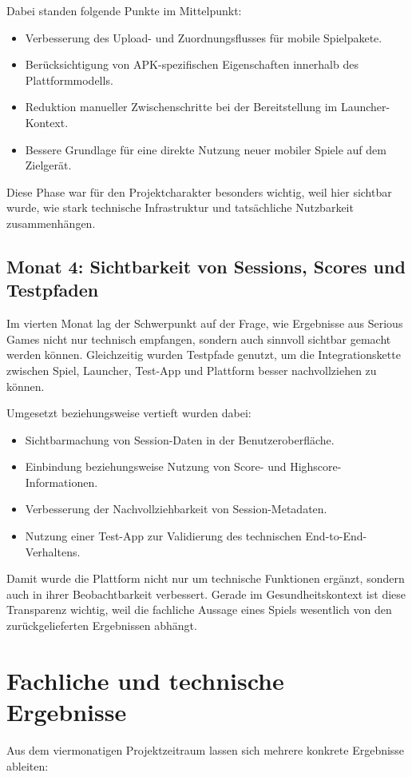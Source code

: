 \documentclass[12pt,a4paper]{article}
\begin{document}
Dabei standen folgende Punkte im Mittelpunkt:
\begin{itemize}[leftmargin=1.5em]
  \item Verbesserung des Upload- und Zuordnungsflusses für mobile Spielpakete.
  \item Berücksichtigung von APK-spezifischen Eigenschaften innerhalb des Plattformmodells.
  \item Reduktion manueller Zwischenschritte bei der Bereitstellung im Launcher-Kontext.
  \item Bessere Grundlage für eine direkte Nutzung neuer mobiler Spiele auf dem Zielgerät.
\end{itemize}

Diese Phase war für den Projektcharakter besonders wichtig, weil hier sichtbar wurde, wie stark technische Infrastruktur und tatsächliche Nutzbarkeit zusammenhängen.

\subsection{Monat 4: Sichtbarkeit von Sessions, Scores und Testpfaden}
Im vierten Monat lag der Schwerpunkt auf der Frage, wie Ergebnisse aus Serious Games nicht nur technisch empfangen, sondern auch sinnvoll sichtbar gemacht werden können. Gleichzeitig wurden Testpfade genutzt, um die Integrationskette zwischen Spiel, Launcher, Test-App und Plattform besser nachvollziehen zu können.

Umgesetzt beziehungsweise vertieft wurden dabei:
\begin{itemize}[leftmargin=1.5em]
  \item Sichtbarmachung von Session-Daten in der Benutzeroberfläche.
  \item Einbindung beziehungsweise Nutzung von Score- und Highscore-Informationen.
  \item Verbesserung der Nachvollziehbarkeit von Session-Metadaten.
  \item Nutzung einer Test-App zur Validierung des technischen End-to-End-Verhaltens.
\end{itemize}

Damit wurde die Plattform nicht nur um technische Funktionen ergänzt, sondern auch in ihrer Beobachtbarkeit verbessert. Gerade im Gesundheitskontext ist diese Transparenz wichtig, weil die fachliche Aussage eines Spiels wesentlich von den zurückgelieferten Ergebnissen abhängt.

\section{Fachliche und technische Ergebnisse}
Aus dem viermonatigen Projektzeitraum lassen sich mehrere konkrete Ergebnisse ableiten:
\end{document}
